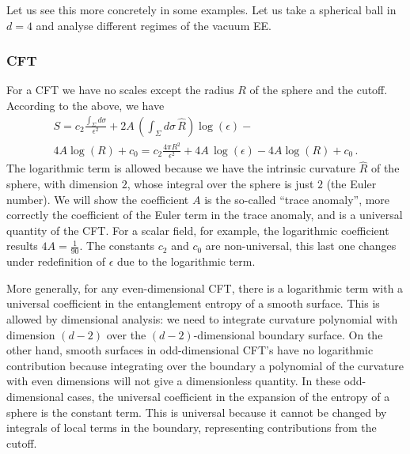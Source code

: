 \documentclass[12pt]{article}
\numberwithin{equation}{section}
\begin{document}
Let us see this more concretely in some examples. Let us take a spherical ball in $d=4$ and analyse different regimes of the vacuum EE.

\subsubsection*{CFT}

For a CFT we have no scales except the radius $R$ of the sphere and the cutoff.
According to the above, we have
\begin{multline}
S=c_2 \frac{\int_\Sigma d\sigma}{\epsilon^2}+ 2 A\, \left(\int_\Sigma d\sigma\, \hat{R}\right) \log(\epsilon) - \\
4 A\log(R) +c_0=c_2 \frac{4 \pi R^2}{\epsilon^2}+ 4 A \, \log(\epsilon) - 4 A\log(R) +c_0\,.
\end{multline}
The logarithmic term is allowed because we have the intrinsic curvature $\hat{R}$ of the sphere, with dimension $2$, whose integral over the sphere is just $2$ (the Euler number). We will show the coefficient $A$ is the so-called ``trace anomaly'', more correctly the coefficient of the Euler term in the trace anomaly, and is a universal quantity of the CFT.  For a scalar field, for example, the logarithmic coefficient results $4A=\frac{1}{90}$. The constants $c_2$ and $c_0$ are non-universal, this last one changes under redefinition of $\epsilon$ due to the logarithmic term.  

More generally, for any even-dimensional CFT, there is a logarithmic term with a universal coefficient in the entanglement entropy of a smooth surface. This is allowed by dimensional analysis: we need to integrate curvature polynomial with dimension $(d-2)$ over the $(d-2)$-dimensional boundary surface.  On the other hand, smooth surfaces in odd-dimensional CFT's have no logarithmic contribution because integrating over the boundary a polynomial of the curvature with even dimensions will not give a dimensionless quantity. In these odd-dimensional cases, the universal coefficient in the expansion of the entropy of a sphere is the constant term. This is universal because it cannot be changed by integrals of local terms in the boundary, representing contributions from the cutoff. 
\end{document}
